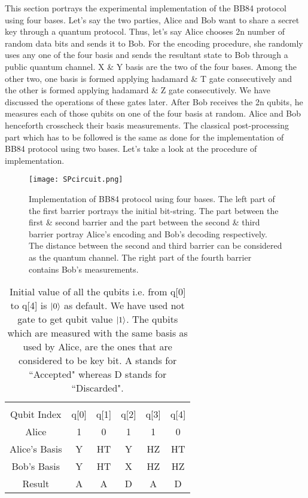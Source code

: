 \documentclass[superscriptaddress,twocolumn,showpacs,prb,floatfix]{revtex4}
\begin{document}
This section portrays the experimental implementation of the BB84 protocol using four bases. Let's say the two parties, Alice and Bob want to share a secret key through a quantum protocol. Thus, let's say Alice chooses 2n number of random data bits and sends it to Bob. For the encoding procedure, she randomly uses any one of the four basis and sends the resultant state to Bob through a public quantum channel. X \& Y basis are the two of the four bases. Among the other two, one basis is formed applying hadamard \& T gate consecutively and the other is formed applying hadamard \& Z gate consecutively. We have discussed the operations of these gates later. After Bob receives the 2n qubits, he measures each of those qubits on one of the four basis at random. Alice and Bob henceforth crosscheck their basis measurements. The classical post-processing part which has to be followed is the same as done for the implementation of BB84 protocol using two bases. Let's take a look at the procedure of implementation. 

\begin{figure}[H]
    \centering
    \texttt{[image: SPcircuit.png]}
    \caption{Implementation of BB84 protocol using four bases. The left part of the first barrier portrays the initial bit-string. The part between the first \& second barrier and the part between the second \& third barrier portray Alice's encoding and Bob's decoding respectively. The distance between the second and third barrier can be considered as the quantum channel. The right part of the fourth barrier contains Bob's measurements.}
    \label{SPcircuit}
\end{figure}

\begin{table}[ht]
    \centering
    \begin{tabular}{|c|c|c|c|c|c|}
    \hline\hline\\[0.5ex]
    Qubit Index & q[0] & q[1] & q[2] & q[3] & q[4] \\ [0.5ex]
    \hline
    Alice & 1 & 0 & 1 & 1 & 0 \\ [0.5ex]
    \hline
    Alice's Basis & Y & HT & Y & HZ & HT\\ [0.5ex]
    \hline
    Bob's Basis & Y & HT & X & HZ & HZ \\ [0.5ex]
    \hline
    Result & A & A & D & A & D \\ [0.5ex]
    \hline 
    \end{tabular}
    \caption{Initial value of all the qubits i.e. from q[0] to q[4] is $\Ket{0}$ as default. We have used not gate to get qubit value $\Ket{1}$. The qubits which are measured with the same basis as used by Alice, are the ones that are considered to be key bit. A stands for ``Accepted" whereas D stands for ``Discarded".}
    \label{qkdtable1}
\end{table}
\end{document}
